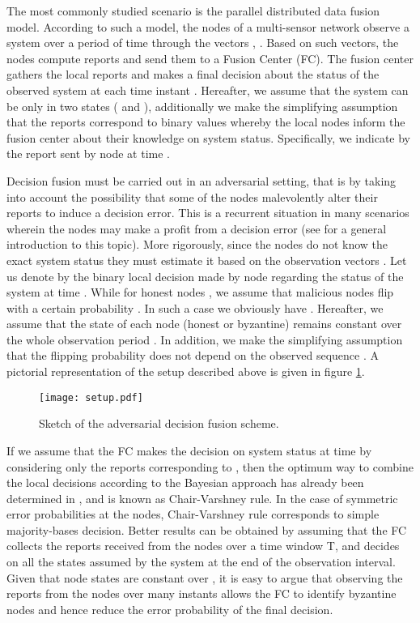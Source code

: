 \documentclass[10pt,peerreview,draftcls,onecolumn]{IEEEtran}
\begin{document}
The most commonly studied scenario is the parallel distributed data fusion model. According to such a model, the  nodes of a multi-sensor network observe a system over a period of time  through the vectors , . Based on such vectors, the nodes compute  reports and send them to a Fusion Center (FC). The fusion center gathers the local reports and makes a final decision about the status of the observed system at each time instant . Hereafter, we assume that the system can be only in two states ( and ), additionally we make the simplifying assumption that the reports correspond to binary values whereby the local nodes inform the fusion center about their knowledge on system status. Specifically, we indicate by  the report sent by node  at time .

Decision fusion must be carried out in an adversarial setting, that is by taking into account the possibility that some of the nodes malevolently alter their reports to induce a decision error. This is a recurrent situation in many scenarios wherein the nodes may make a profit from a decision error (see \cite{Vemp13} for a general introduction to this topic). More rigorously, since the nodes do not know the exact system status they must estimate it based on the observation vectors . Let us denote by  the binary local decision made by node  regarding the status of the system at time . While for honest nodes , we assume that malicious nodes flip  with a certain probability . In such a case we obviously have . Hereafter, we assume that the state of each node (honest or byzantine) remains constant over the whole observation period . In addition, we make the simplifying assumption that the flipping probability does not depend on the observed sequence .
A pictorial representation of the setup described above is given in figure \ref{fig.setup}.
\begin{figure}[t!]
\centering
    \texttt{[image: setup.pdf]}
    \caption{Sketch of the adversarial decision fusion scheme. \vspace{-0.5cm}}
    \label{fig.setup}
\end{figure}
If we assume that the FC makes the decision on system status at time  by considering only the reports corresponding to , then the optimum way to combine the local decisions according to the Bayesian approach has already been determined in \cite{OptFusion,Var97}, and is known as Chair-Varshney rule. In the case of symmetric error probabilities at the nodes, Chair-Varshney rule corresponds to simple majority-bases decision.
Better results can be obtained by assuming that the FC collects the reports received from the nodes over a time window T, and decides on all the states assumed by the system at the end of the observation interval. Given that node states are constant over , it is easy to argue that observing the reports from the nodes over many instants allows the FC to identify byzantine nodes and hence reduce the error probability of the final decision.
\end{document}
